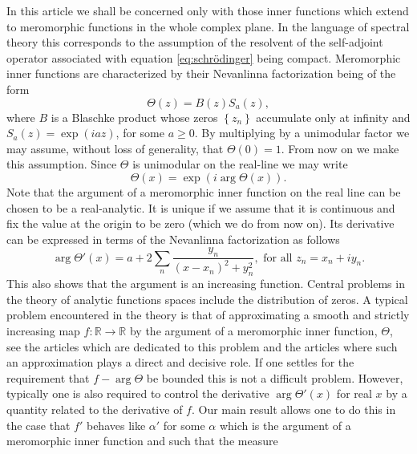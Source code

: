 \documentclass{article}[12pt]
\theoremstyle{remark}
\begin{document}
In this article we shall be concerned only with those inner functions which extend to meromorphic functions in the whole complex plane. In the language of spectral theory this corresponds to the assumption of the resolvent of the self-adjoint operator associated with equation \eqref{eq:schrödinger} being compact. Meromorphic inner functions are characterized by their Nevanlinna factorization being of the form
\begin{equation*}
    \Theta(z) = B(z)S_{a}(z),    
\end{equation*}
where $B$ is a Blaschke product whose zeros $\left\{ z_{n} \right\}$ accumulate only at infinity and $S_{a}(z) = \exp(iaz)$, for some $a \geq 0$. By multiplying by a unimodular factor we may assume, without loss of generality, that $\Theta(0) = 1$. From now on we make this assumption. Since $\Theta$ is unimodular on the real-line we may write
\begin{equation*}
    \Theta(x) = \exp(i\arg\Theta(x)).
\end{equation*}
Note that the argument of a meromorphic inner function on the real line can be chosen to be a real-analytic. It is unique if we assume that it is continuous and fix the value at the origin to be zero (which we do from now on). Its derivative can be expressed in terms of the Nevanlinna factorization as follows
\begin{equation*}
    \arg \Theta'(x) = a + 2\sum_{n} \frac{y_{n}}{(x-x_{n})^{2} + y_{n}^{2}}, \text{ for all } z_{n} = x_{n}+iy_{n}.
\end{equation*}
This also shows that the argument is an increasing function. Central problems in the theory of analytic functions spaces include the distribution of zeros. A typical problem encountered in the theory is that of approximating a smooth and strictly increasing map $f : \mathbb{R} \to \mathbb{R}$ by the argument of a meromorphic inner function, $\Theta$, see the articles \cite{MR3631454, alexei_rupam_bounded_phase} which are dedicated to this problem and the articles \cite{MR2215727, MR2609247, MR2910798, MR2628803} where such an approximation plays a direct and decisive role. If one settles for the requirement that $f-\arg \Theta$ be bounded this is not a difficult problem. However, typically one is also required to control the derivative $\arg \Theta'(x)$ for real $x$ by a quantity related to the derivative of $f$. Our main result allows one to do this in the case that $f'$ behaves like $\alpha'$ for some $\alpha$ which is the argument of a meromorphic inner function and such that the measure
\end{document}
